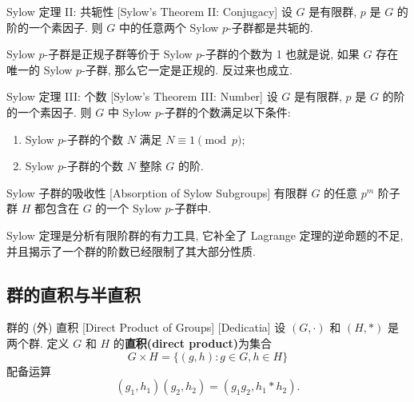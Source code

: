         \begin{thm}
            [Sylow2]
            {Sylow 定理 II: 共轭性}
            [Sylow's Theorem II: Conjugacy]
            设 \(G\) 是有限群, \(p\) 是 \(G\) 的阶的一个素因子. 则 \(G\) 中的任意两个 Sylow $p$-子群都是共轭的.
        \end{thm}

        \begin{ppt}
            {Sylow \(p\)-子群是正规子群等价于 Sylow \(p\)-子群的个数为 1}
            也就是说, 如果 \(G\) 存在唯一的 Sylow \(p\)-子群, 那么它一定是正规的. 反过来也成立.
        \end{ppt}

        \begin{thm}
            [Sylow3]
            {Sylow 定理 III: 个数}
            [Sylow's Theorem III: Number]
            设 \(G\) 是有限群, \(p\) 是 \(G\) 的阶的一个素因子. 则 \(G\) 中 Sylow $p$-子群的个数满足以下条件:
            \begin{enumerate}[label=(\roman*)]
                \item Sylow $p$-子群的个数 \(N\) 满足 \(N\equiv 1\pmod p\);
                \item Sylow $p$-子群的个数 \(N\) 整除 \(G\) 的阶.
            \end{enumerate}
        \end{thm}

        \begin{crl}
            [Sylow4]
            {Sylow 子群的吸收性}
            [Absorption of Sylow Subgroups]
            有限群 \(G\) 的任意 \(p^m\) 阶子群 \(H\) 都包含在 \(G\) 的一个 Sylow \(p\)-子群中.
        \end{crl}

        \begin{rmk}
            [Dedicatia]
            Sylow 定理是分析有限阶群的有力工具, 它补全了 Lagrange 定理的逆命题的不足, 并且揭示了一个群的阶数已经限制了其大部分性质. 
        \end{rmk}

    \subsection{群的直积与半直积}

        \begin{dfn}
            {群的 (外) 直积}
            [Direct Product of Groups]
            [Dedicatia]
            设 \((G,\cdot)\) 和 \((H,*)\) 是两个群. 定义 \(G\) 和 \(H\) 的\textbf{直积(direct product)}为集合
            \[G\times H=\{(g,h): g\in G, h\in H\}\]
            配备运算
            \[(g_1,h_1)(g_2,h_2)=(g_1g_2, h_1*h_2).\]
        \end{dfn}

